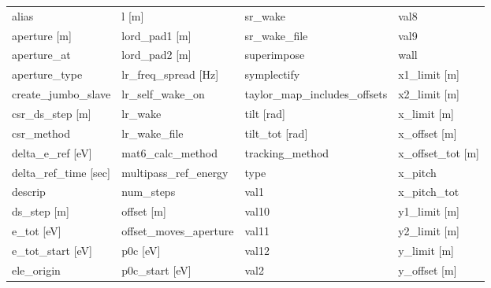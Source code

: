  \begin{tabular}{llll} \toprule
alias                            & l [m]                            & sr_wake                          & val8                             \\
aperture [m]                     & lord_pad1 [m]                    & sr_wake_file                     & val9                             \\
aperture_at                      & lord_pad2 [m]                    & superimpose                      & wall                             \\
aperture_type                    & lr_freq_spread [Hz]              & symplectify                      & x1_limit [m]                     \\
create_jumbo_slave               & lr_self_wake_on                  & taylor_map_includes_offsets      & x2_limit [m]                     \\
csr_ds_step [m]                  & lr_wake                          & tilt [rad]                       & x_limit [m]                      \\
csr_method                       & lr_wake_file                     & tilt_tot [rad]                   & x_offset [m]                     \\
delta_e_ref [eV]                 & mat6_calc_method                 & tracking_method                  & x_offset_tot [m]                 \\
delta_ref_time [sec]             & multipass_ref_energy             & type                             & x_pitch                          \\
descrip                          & num_steps                        & val1                             & x_pitch_tot                      \\
ds_step [m]                      & offset [m]                       & val10                            & y1_limit [m]                     \\
e_tot [eV]                       & offset_moves_aperture            & val11                            & y2_limit [m]                     \\
e_tot_start [eV]                 & p0c [eV]                         & val12                            & y_limit [m]                      \\
ele_origin                       & p0c_start [eV]                   & val2                             & y_offset [m]                     \\

\end{tabular}
